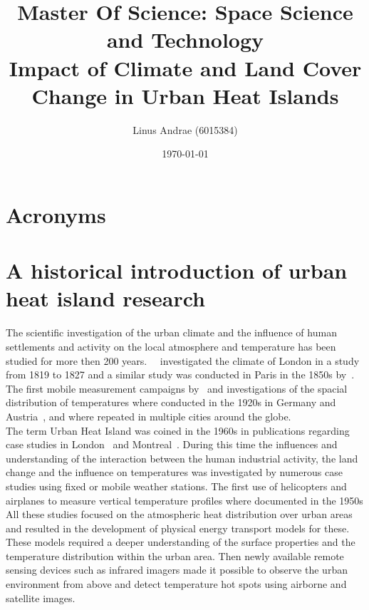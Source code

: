 \documentclass[a4paper, english]{article}
\title{\vspace{1cm}Master Of Science: Space Science and Technology\\ \vspace{1cm} \textbf{\huge Impact of Climate and Land Cover Change in Urban Heat Islands}\\ \vspace{1.2cm} }
\author{Linus Andrae (6015384)}
\date{\today}
\begin{document}
  
  \newpage

  
  \newpage

  \tableofcontents
  \listoffigures
  \listoftables

  \section*{Acronyms}
  \printglossaries%
\newpage

\section{A historical introduction of urban heat island research}
  The scientific investigation of the urban climate and the influence of human settlements and activity on the local atmosphere and temperature has been studied for more then 200 years.%
~\cite{Howard1833}~investigated the climate of London in a study from 1819 to 1827 and a similar study was conducted in Paris in the 1850s by~\cite{renou1862differences}.%
  The first mobile measurement campaigns by~\cite{peppler1929auto} and investigations of the spacial distribution of temperatures where conducted in the 1920s in Germany and Austria~\cite{tollner1932untersuchungen}, and where repeated in multiple cities around the globe.\\%
  The term Urban Heat Island was coined in the 1960s in publications regarding case studies in London~\cite{Chandler1961} and Montreal~\cite{Oke1968}.
  During this time the influences and understanding of the interaction between the human industrial activity, the land change and the influence on temperatures was investigated by numerous case studies using fixed or mobile weather stations. 
  The first use of helicopters and airplanes to measure vertical temperature profiles where documented in the 1950s 
  All these studies focused on the atmospheric heat distribution over urban areas and resulted in the development of physical energy transport models for these. 
  These models required a deeper understanding of the surface properties and the temperature distribution within the urban area. 
  Then newly available remote sensing devices such as infrared imagers made it possible to observe the urban environment from above and detect temperature hot spots using airborne and satellite images.  
\end{document}
